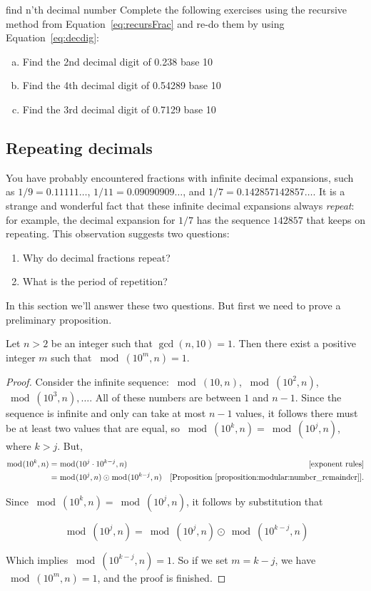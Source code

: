 \begin{exercise} {find n'th decimal number}
Complete the following exercises using the recursive method from Equation~\eqref{eq:recursFrac} and re-do them by using Equation~\eqref{eq:decdig}:
\begin{enumerate}[(a)]
\item Find the 2nd decimal digit of 0.238 base 10
\item Find the 4th decimal digit of 0.54289 base 10
\item Find the 3rd decimal digit of 0.7129 base 10

\end{enumerate}
\end{exercise}


\subsection{Repeating decimals}
You have probably encountered  fractions with infinite decimal expansions, such as $1/9 = 0.11111\ldots$, $1/11 = 0.09090909\ldots$, and $1/7 = 0.142857142857\ldots$. It is a strange and wonderful fact that these infinite decimal expansions always \emph{repeat}: for example, the decimal expansion for $1/7$ has the sequence $142857$ that keeps on repeating. This observation suggests two questions:
\begin{enumerate}
\item Why do decimal fractions repeat?
\item What is the period of repetition?
\end{enumerate}

In this section we'll answer these two questions. But first we need to prove a preliminary proposition.

\begin{prop}\label{proposition:bases:10power}
Let $n>2$ be an integer such that $\gcd(n,10)=1$. Then there exist a positive integer $m$ such that $\bmod(10^{m},n)=1$.
\end{prop}
\begin{proof}
Consider the infinite sequence: $\bmod(10,n)$, $\bmod(10^{2},n)$, $\bmod(10^{3},n),\dots$. All of these numbers are between $1$ and $n-1$. Since the sequence is infinite and only can take at most $n-1$ values, it follows there must be at least two values that are equal, so $\bmod(10^{k},n)=\bmod(10^{j},n)$, where $k>j$. But,
\begin{align*}
\bmod(10^{k},n)&=\bmod(10^{j}\cdot 10^{k-j},n) & \text{[exponent rules]}\\
&=\bmod(10^{j},n)\odot \bmod(10^{k-j},n) &\text{[Proposition~\ref{proposition:modular:number_remainder}]}.
\end{align*}

Since $\bmod(10^{k},n)=\bmod(10^{j},n)$, it follows by substitution that

\begin{equation*}
\bmod(10^{j},n)=\bmod(10^j,n)\odot \bmod(10^{k-j},n)
\end{equation*}

Which implies $\bmod(10^{k-j},n)=1$.
So if we set $m=k-j$, we have $\bmod(10^{m},n)=1$, and the proof is finished.
\end{proof}


